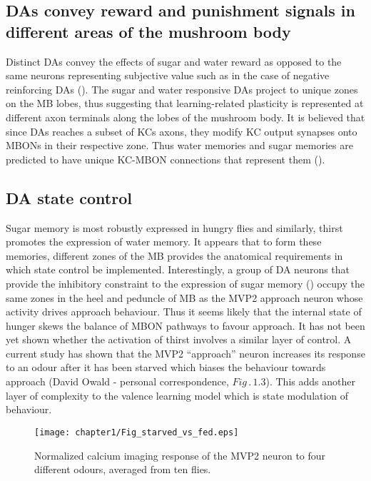 \subsection{DAs convey reward and punishment signals in different areas of the
mushroom body }

Distinct DAs convey the effects of sugar and water reward as opposed
to the same neurons representing subjective value such as in the case
of negative reinforcing DAs (\citealp{Perisse:2013fp}). The sugar
and water responsive DAs project to unique zones on the MB lobes,
thus suggesting that learning-related plasticity is represented at
different axon terminals along the lobes of the mushroom body. It
is believed that since DAs reaches a subset of KCs axons, they modify
KC output synapses onto MBONs in their respective zone. Thus water
memories and sugar memories are predicted to have unique KC-MBON connections
that represent them (\citealp{Lin:2014ix}).


\subsection{DA state control}

Sugar memory is most robustly expressed in hungry flies and similarly,
thirst promotes the expression of water memory. It appears that to
form these memories, different zones of the MB provides the anatomical
requirements in which state control be implemented. Interestingly,
a group of DA neurons that provide the inhibitory constraint to the
expression of sugar memory (\citealp{Lin:2014ix}) occupy the same
zones in the heel and peduncle of MB as the MVP2 approach neuron whose
activity drives approach behaviour. Thus it seems likely that the
internal state of hunger skews the balance of MBON pathways to favour
approach. It has not been yet shown whether the activation of thirst
involves a similar layer of control. A current study has shown that
the MVP2 ``approach'' neuron increases its response to an odour
after it has been starved which biases the behaviour towards approach
(David Owald - personal correspondence, $Fig\,.\,1.3$). This adds
another layer of complexity to the valence learning model which is
state modulation of behaviour.


\begin{figure}[H]
%
\texttt{[image: chapter1/Fig\_starved\_vs\_fed.eps]}


\caption[Activity in the MVP2 neuron starved and fed]{%
 Normalized calcium imaging response of the MVP2 neuron to four different
odours, averaged from ten flies. %
}
\end{figure}

